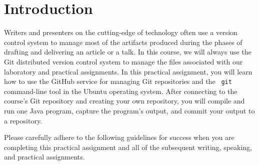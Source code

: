 

\usepackage[compact]{titlesec}



\vspace*{-.2in}
\section*{Introduction}

Writers and presenters on the cutting-edge of technology often use a version control system to manage most of the
artifacts produced during the phases of drafting and delivering an article or a talk. In this course, we will always use
the Git distributed version control system to manage the files associated with our laboratory and practical assignments.
In this practical assignment, you will learn how to use the GitHub service for managing Git repositories and the {\tt
git} command-line tool in the Ubuntu operating system. After connecting to the course's Git repository and creating your
own repository, you will compile and run one Java program, capture the program's output, and commit your output to a
repository.

Please carefully adhere to the following guidelines for success when you are completing this practical assignment and
all of the subsequent writing, speaking, and practical assignments.

